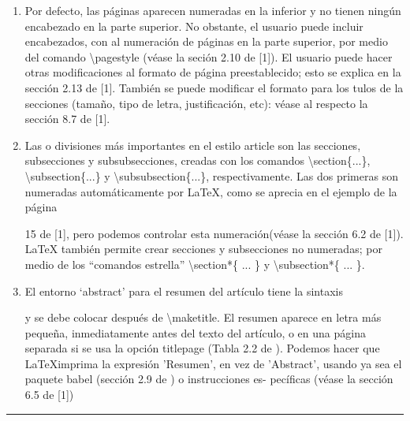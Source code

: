 \documentclass[12pt]{book}
\begin{document}
\begin{multicols}{2}
\begin{enumerate}
    la Tabla 2.2 de [1]. 
    \item[\HandCuffRight]  Por defecto, las páginas aparecen numeradas en la inferior y no tienen ningún encabezado en la parte superior. No obstante, el usuario puede incluir encabezados, con al numeración de páginas en la parte superior, por medio del comando \textbackslash pagestyle (véase la seción 2.10 de [1]). El usuario puede hacer otras modificaciones al formato de página preestablecido; esto se explica en la sección 2.13 de [1]. También se puede modificar el formato para los tulos de la secciones (tamaño, tipo de letra, justificación, etc): véase al respecto la sección 8.7 de [1].
    \item[\HandCuffRight] Las \hspace{2pt} o \hspace{2pt} divisiones más importantes en el estilo article son las secciones, subsecciones y subsubsecciones, creadas con los comandos \textbackslash section\{...\}, \textbackslash subsection\{...\} \hspace{1cm} y \textbackslash subsubsection\{...\}, respectivamente. Las dos primeras son numeradas automáticamente por \LaTeX, como se aprecia en el ejemplo de la página \newpage {}
    15 de [1], pero podemos controlar esta numeración(véase la sección 6.2 de [1]). \LaTeX 
    también permite crear secciones y subsecciones no numeradas; por medio de los \textquotedblleft comandos estrella\textquotedblright  \hspace{1pt} \textbackslash section*\{ ... \} y \textbackslash subsection*\{ ... \}.

    \item[\HandCuffRight] El entorno \textquoteleft abstract\textquoteright \hspace{1pt} para el resumen del artículo tiene la sintaxis
    
    y se debe colocar después de
    \textbackslash maketitle. El resumen aparece en letra más pequeña, inmediatamente antes del texto
    del artículo, o en una página
    separada si se usa la opción
    titlepage (Tabla 2.2 de \cite{Rodrigo de Castro Korgi}).
    Podemos hacer que \LaTeX imprima la expresión ’Resumen’, en vez de ’Abstract’, usando
    ya sea el paquete babel (sección
    2.9 de \cite{Rodrigo de Castro Korgi}) o instrucciones es-
    pecíficas (véase la sección 6.5 de
    [1])
\end{enumerate}
\end{multicols}
\begin{center}
    \rule{15cm}{4pt}\par 
\end{center}
\end{document}
